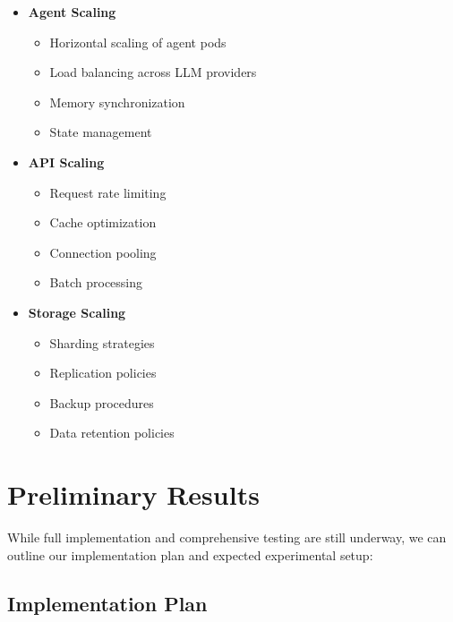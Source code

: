 \documentclass{article}
\begin{document}
\begin{itemize}
    \item \textbf{Agent Scaling}
    \begin{itemize}
        \item Horizontal scaling of agent pods
        \item Load balancing across LLM providers
        \item Memory synchronization
        \item State management
    \end{itemize}
    
    \item \textbf{API Scaling}
    \begin{itemize}
        \item Request rate limiting
        \item Cache optimization
        \item Connection pooling
        \item Batch processing
    \end{itemize}
    
    \item \textbf{Storage Scaling}
    \begin{itemize}
        \item Sharding strategies
        \item Replication policies
        \item Backup procedures
        \item Data retention policies
    \end{itemize}
\end{itemize}

\section{Preliminary Results}
\label{sec:results}

While full implementation and comprehensive testing are still underway, we can outline our implementation plan and expected experimental setup:

\subsection{Implementation Plan}
\end{document}
